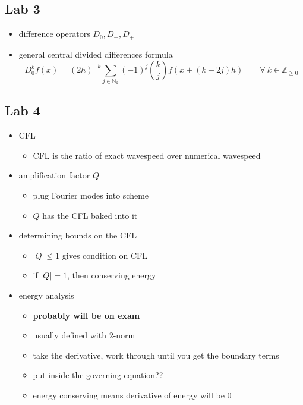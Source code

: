 \documentclass[
]{article}
\providecommand{\tightlist}{%
  \setlength{\itemsep}{0pt}\setlength{\parskip}{0pt}}
\begin{document}
\hypertarget{lab-3}{%
\subsection{Lab 3}\label{lab-3}}

\begin{itemize}
\tightlist
\item
  difference operators \(D_0, D_-, D_+\)
\item
  general central divided differences formula \[
        D_0^k f(x) = (2h)^{-k} 
        \sum_{j \in \mathbb{N}_k }
        (-1)^j \binom{k}{j}
        f( x + (k - 2j) h)
        \qquad
        \forall \ k \in \mathbb{Z}_{\geq 0} 
    \]
\end{itemize}

\hypertarget{lab-4}{%
\subsection{Lab 4}\label{lab-4}}

\begin{itemize}
\tightlist
\item
  CFL

  \begin{itemize}
  \tightlist
  \item
    CFL is the ratio of exact wavespeed over numerical wavespeed
  \end{itemize}
\item
  amplification factor \(Q\)

  \begin{itemize}
  \tightlist
  \item
    plug Fourier modes into scheme
  \item
    \(Q\) has the CFL baked into it
  \end{itemize}
\item
  determining bounds on the CFL

  \begin{itemize}
  \tightlist
  \item
    \(|Q| \leq 1\) gives condition on CFL
  \item
    if \(|Q| = 1\), then conserving energy
  \end{itemize}
\item
  energy analysis

  \begin{itemize}
  \tightlist
  \item
    \textbf{probably will be on exam}
  \item
    usually defined with \(2\)-norm
  \item
    take the derivative, work through until you get the boundary terms
  \item
    put inside the governing equation??
  \item
    energy conserving means derivative of energy will be 0
  \end{itemize}
\end{itemize}
\end{document}
